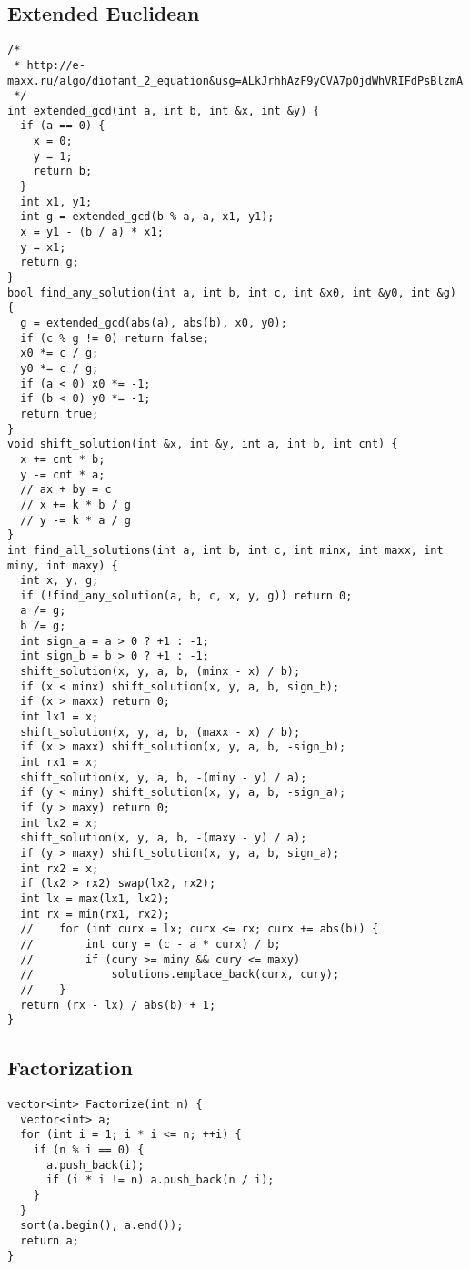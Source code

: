 \documentclass[twoside]{article}
\begin{document}
\begin{multicols*}{2}
{\subsection*{Extended Euclidean}
}
\begin{verbatim}
/*
 * http://e-maxx.ru/algo/diofant_2_equation&usg=ALkJrhhAzF9yCVA7pOjdWhVRIFdPsBlzmA
 */
int extended_gcd(int a, int b, int &x, int &y) {
  if (a == 0) {
    x = 0;
    y = 1;
    return b;
  }
  int x1, y1;
  int g = extended_gcd(b % a, a, x1, y1);
  x = y1 - (b / a) * x1;
  y = x1;
  return g;
}
bool find_any_solution(int a, int b, int c, int &x0, int &y0, int &g) {
  g = extended_gcd(abs(a), abs(b), x0, y0);
  if (c % g != 0) return false;
  x0 *= c / g;
  y0 *= c / g;
  if (a < 0) x0 *= -1;
  if (b < 0) y0 *= -1;
  return true;
}
void shift_solution(int &x, int &y, int a, int b, int cnt) {
  x += cnt * b;
  y -= cnt * a;
  // ax + by = c
  // x += k * b / g
  // y -= k * a / g
}
int find_all_solutions(int a, int b, int c, int minx, int maxx, int miny, int maxy) {
  int x, y, g;
  if (!find_any_solution(a, b, c, x, y, g)) return 0;
  a /= g;
  b /= g;
  int sign_a = a > 0 ? +1 : -1;
  int sign_b = b > 0 ? +1 : -1;
  shift_solution(x, y, a, b, (minx - x) / b);
  if (x < minx) shift_solution(x, y, a, b, sign_b);
  if (x > maxx) return 0;
  int lx1 = x;
  shift_solution(x, y, a, b, (maxx - x) / b);
  if (x > maxx) shift_solution(x, y, a, b, -sign_b);
  int rx1 = x;
  shift_solution(x, y, a, b, -(miny - y) / a);
  if (y < miny) shift_solution(x, y, a, b, -sign_a);
  if (y > maxy) return 0;
  int lx2 = x;
  shift_solution(x, y, a, b, -(maxy - y) / a);
  if (y > maxy) shift_solution(x, y, a, b, sign_a);
  int rx2 = x;
  if (lx2 > rx2) swap(lx2, rx2);
  int lx = max(lx1, lx2);
  int rx = min(rx1, rx2);
  //    for (int curx = lx; curx <= rx; curx += abs(b)) {
  //        int cury = (c - a * curx) / b;
  //        if (cury >= miny && cury <= maxy)
  //            solutions.emplace_back(curx, cury);
  //    }
  return (rx - lx) / abs(b) + 1;
}

\end{verbatim}

{
\subsection*{Factorization}
}
\begin{verbatim}
vector<int> Factorize(int n) {
  vector<int> a;
  for (int i = 1; i * i <= n; ++i) {
    if (n % i == 0) {
      a.push_back(i);
      if (i * i != n) a.push_back(n / i);
    }
  }
  sort(a.begin(), a.end());
  return a;
}
\end{verbatim}


\end{multicols*}
\end{document}
